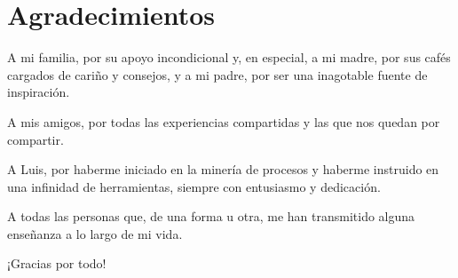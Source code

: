 
\chapter*{Agradecimientos}
\thispagestyle{empty}

\vspace*{1cm}

A mi familia, por su apoyo incondicional y, en especial, a mi madre, por sus cafés cargados de cariño y consejos, y a mi padre, por ser una inagotable fuente de inspiración.

\vspace*{1cm}

A mis amigos, por todas las experiencias compartidas y las que nos quedan por compartir.

\vspace*{1cm}

A Luis, por haberme iniciado en la minería de procesos y haberme instruido en una infinidad de herramientas, siempre con entusiasmo y dedicación.

\vspace*{1cm}

A todas las personas que, de una forma u otra, me han transmitido alguna enseñanza a lo largo de mi vida.

\vspace*{1cm}

¡Gracias por todo!

\newpage
